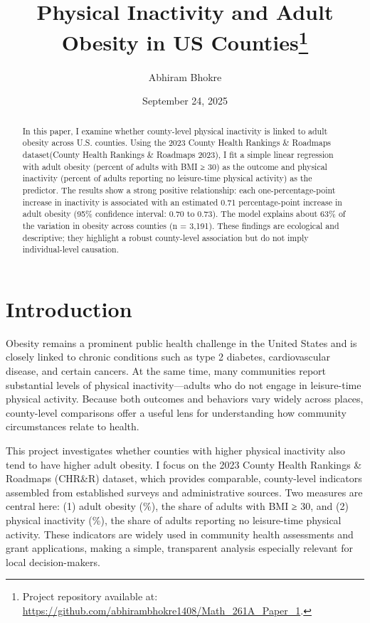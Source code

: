 \documentclass[
  letterpaper,
  DIV=11,
  numbers=noendperiod]{scrartcl}
\title{Physical Inactivity and Adult Obesity in US
Counties\thanks{Project repository available at:
\url{https://github.com/abhirambhokre1408/Math_261A_Paper_1}.}}
\author{Abhiram Bhokre}
\date{September 24, 2025}
\begin{document}
\maketitle
\begin{abstract}
In this paper, I examine whether county-level physical inactivity is
linked to adult obesity across U.S. counties. Using the 2023 County
Health Rankings \& Roadmaps dataset(County Health Rankings \& Roadmaps
2023), I fit a simple linear regression with adult obesity (percent of
adults with BMI ≥ 30) as the outcome and physical inactivity (percent of
adults reporting no leisure-time physical activity) as the predictor.
The results show a strong positive relationship: each
one-percentage-point increase in inactivity is associated with an
estimated 0.71 percentage-point increase in adult obesity (95\%
confidence interval: 0.70 to 0.73). The model explains about 63\% of the
variation in obesity across counties (n = 3,191). These findings are
ecological and descriptive; they highlight a robust county-level
association but do not imply individual-level causation.
\end{abstract}


\section{Introduction}\label{introduction}

Obesity remains a prominent public health challenge in the United States
and is closely linked to chronic conditions such as type 2 diabetes,
cardiovascular disease, and certain cancers. At the same time, many
communities report substantial levels of physical inactivity---adults
who do not engage in leisure-time physical activity. Because both
outcomes and behaviors vary widely across places, county-level
comparisons offer a useful lens for understanding how community
circumstances relate to health.

This project investigates whether counties with higher physical
inactivity also tend to have higher adult obesity. I focus on the 2023
County Health Rankings \& Roadmaps (CHR\&R) dataset, which provides
comparable, county-level indicators assembled from established surveys
and administrative sources. Two measures are central here: (1) adult
obesity (\%), the share of adults with BMI ≥ 30, and (2) physical
inactivity (\%), the share of adults reporting no leisure-time physical
activity. These indicators are widely used in community health
assessments and grant applications, making a simple, transparent
analysis especially relevant for local decision-makers.
\end{document}
